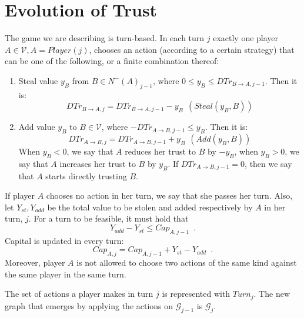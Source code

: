\documentclass[11pt]{llncs}
\theoremstyle{definition}
\begin{document}
   \section{Evolution of Trust}
     \begin{definition}[Turns]
        The game we are describing is turn-based. In each turn $j$ exactly one player $A \in \mathcal{V}, A =
        Player\left(j\right)$, chooses an action (according to a certain strategy) that can be one of the following, or a
        finite combination thereof:
        \begin{enumerate}
           \item Steal value $y_B$ from $B \in N^{-}\left(A\right)_{j-1}$, where
           $0 \leq y_B \leq DTr_{B \rightarrow A, j-1}$. Then it is:
           \begin{equation*}
              DTr_{B \rightarrow A, j} = DTr_{B \rightarrow A, j-1} - y_B \:\: \left(Steal\left(y_B, B\right)\right)
           \end{equation*}
           \item Add value $y_B$ to $B \in \mathcal{V}$, where $-DTr_{A \rightarrow B, j-1} \leq y_B$. Then it is:
           \begin{equation*}
              DTr_{A \rightarrow B, j} = DTr_{A \rightarrow B, j-1} + y_B \:\: \left(Add\left(y_B, B\right)\right)
           \end{equation*}
           When $y_B < 0$, we say that $A$ reduces her trust to $B$ by $-y_B$, when $y_B > 0$, we say that $A$ increases her
           trust to $B$ by $y_B$. If $DTr_{A \rightarrow B, j-1} = 0$, then we say that $A$ starts directly trusting $B$.
        \end{enumerate}
        If player $A$ chooses no action in her turn, we say that she passes her turn. Also, let $Y_{st}, Y_{add}$ be the
        total value to be stolen and added respectively by $A$ in her turn, $j$. For a turn to be feasible, it must hold that
        \begin{equation}
           Y_{add} - Y_{st} \leq Cap_{A, j-1} \enspace.
        \end{equation}
        Capital is updated in every turn:
        \begin{equation}
           Cap_{A, j} = Cap_{A, j-1} + Y_{st} - Y_{add} \enspace.
        \end{equation}
        Moreover, player $A$ is not allowed to choose two actions of the same kind against the same player in the same turn.

        The set of actions a player makes in turn $j$ is represented with $Turn_j$. The new graph that emerges by applying
        the actions on $\mathcal{G}_{j-1}$ is $\mathcal{G}_j$.
     \end{definition}
\end{document}
